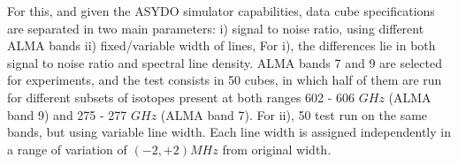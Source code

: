 For this, and given the ASYDO simulator capabilities, data cube specifications are separated in two main parameters:
i) signal to noise ratio, using different ALMA bands
ii) fixed/variable width of lines, 
For i), the differences lie in both signal to noise ratio and spectral line density.
ALMA bands 7 and 9 are selected for experiments, and the test consists in 50 cubes, in which half of them are run for different subsets of isotopes present at both ranges 602 - 606 $GHz$ (ALMA band 9) and 275 - 277 $GHz$ (ALMA band 7).
For ii), 50 test run on the same bands, but using variable line width.
Each line width is assigned independently in a range of variation of $(-2, +2) MHz$ from original width.


